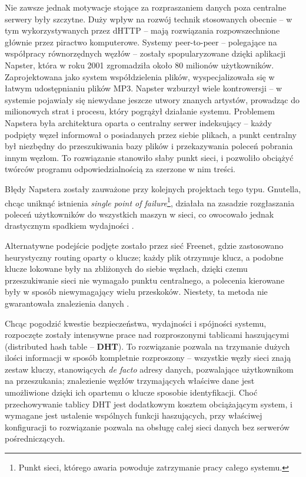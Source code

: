 Nie zawsze jednak motywacje stojące za rozpraszaniem danych poza centralne serwery były szczytne. Duży wpływ na rozwój technik stosowanych obecnie -- w tym wykorzystywanych przez dHTTP -- mają rozwiązania rozpowszechnione głównie przez piractwo komputerowe. Systemy peer-to-peer -- polegające na współpracy równorzędnych węzłów -- zostały spopularyzowane dzięki aplikacji Napster, która w roku 2001 zgromadziła około 80 milionów użytkowników. Zaprojektowana jako system współdzielenia plików, wyspecjalizowała się w łatwym udostępnianiu plików MP3. Napster wzburzył wiele kontrowersji -- w systemie pojawiały się niewydane jeszcze utwory znanych artystów, prowadząc do milionowych strat i procesu, który pogrążył działanie systemu.
Problemem Napstera była architektura oparta o centralny serwer indeksujący -- każdy podpięty węzeł informował o posiadanych przez siebie plikach, a punkt centralny był niezbędny do przeszukiwania bazy plików i przekazywania poleceń pobrania innym węzłom. To rozwiązanie stanowiło słaby punkt sieci, i pozwoliło obciążyć twórców programu odpowiedzialnością za szerzone w nim treści.

Błędy Napstera zostały zauważone przy kolejnych projektach tego typu. Gnutella, chcąc uniknąć istnienia {\em single point of failure}\footnote{Punkt sieci, którego awaria powoduje zatrzymanie pracy całego systemu.}, działała na zasadzie rozgłaszania poleceń użytkowników do wszystkich maszyn w sieci, co owocowało jednak drastycznym spadkiem wydajności \cite{measuringNapsterGnutella}.

Alternatywne podejście podjęte zostało przez sieć Freenet, gdzie zastosowano heurystyczny routing oparty o klucze; każdy plik otrzymuje klucz, a podobne klucze lokowane były na zbliżonych do siebie węzłach, dzięki czemu przeszukiwanie sieci nie wymagało punktu centralnego, a polecenia kierowane były w sposób niewymagający wielu przeskoków. Niestety, ta metoda nie gwarantowała znalezienia danych \cite{searchingInSmallWorld}.

Chcąc pogodzić kwestie bezpieczeństwa, wydajności i spójności systemu, rozpoczęte zostały intensywne prace nad rozproszonymi tablicami haszującymi (distributed hash table -- \textbf{DHT}). To rozwiązanie pozwala na trzymanie dużych ilości informacji w sposób kompletnie rozproszony -- wszystkie węzły sieci znają zestaw kluczy, stanowiących {\em de facto} adresy danych, pozwalające użytkownikom na przeszukania; znalezienie węzłów trzymających właściwe dane jest umożliwione dzięki ich opartemu o klucze sposobie identyfikacji. Choć przechowywanie tablicy DHT jest dodatkowym kosztem obciążającym system, i wymagane jest ustalenie wspólnych funkcji haszujących, przy właściwej konfiguracji to rozwiązanie pozwala na obsługę całej sieci danych bez serwerów pośredniczących.

